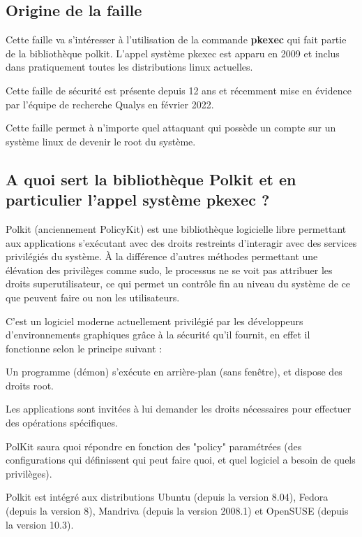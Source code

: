 \documentclass[a4paper, 12pt]{article}
\begin{document}
		\subsection{Origine de la faille}   
   		\begin{flushleft}
   			\noindent Cette faille va s'intéresser à l'utilisation de la commande \textbf{pkexec} qui fait partie de la bibliothèque polkit. L'appel système pkexec est apparu en 2009 et inclus dans pratiquement toutes les distributions linux actuelles.
   			\item Cette faille de sécurité est présente depuis 12 ans et récemment mise en évidence par l'équipe de recherche Qualys en février 2022. \cite{qualys}
   			\item Cette faille permet à n’importe quel attaquant qui possède un compte sur un système linux de devenir le root du système.
            \subsection{A quoi sert la bibliothèque Polkit et en particulier l'appel système pkexec ? }
            \begin{flushleft}
                \noindent Polkit (anciennement PolicyKit) est une bibliothèque logicielle libre permettant aux applications s'exécutant avec des droits restreints d'interagir avec des services privilégiés du système. À la différence d'autres méthodes permettant une élévation des privilèges comme sudo, le processus ne se voit pas attribuer les droits superutilisateur, ce qui permet un contrôle fin au niveau du système de ce que peuvent faire ou non les utilisateurs. \cite{policyki47:online}
                \item C'est un logiciel moderne actuellement privilégié par les développeurs d'environnements graphiques grâce à la sécurité qu'il fournit, en effet il fonctionne selon le principe suivant : 
                \item Un programme (démon) s'exécute en arrière-plan (sans fenêtre), et dispose des droits root.
                \item Les applications sont invitées à lui demander les droits nécessaires pour effectuer des opérations spécifiques.
                \item PolKit saura quoi répondre en fonction des "policy" paramétrées (des configurations qui définissent qui peut faire quoi, et quel logiciel a besoin de quels privilèges).
                \item Polkit est intégré aux distributions Ubuntu (depuis la version 8.04), Fedora (depuis la version 8), Mandriva (depuis la version 2008.1) et OpenSUSE (depuis la version 10.3).

\end{flushleft}
\end{flushleft}
\end{document}
